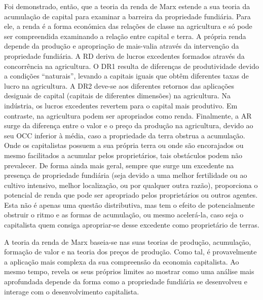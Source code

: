 Foi demonstrado, então, que a teoria da renda de Marx estende a sua teoria da acumulação de capital para examinar a barreira da propriedade fundiária. Para ele, a renda é a forma económica das relações de classe na agricultura e só pode ser compreendida examinando a relação entre capital e terra. A própria renda depende da produção e apropriação de mais-valia através da intervenção da propriedade fundiária. A RD deriva de lucros excedentes formados através da concorrência na agricultura. O DR1 resulta de diferenças de produtividade devido a condições “naturais”, levando a capitais iguais que obtêm diferentes taxas de lucro na agricultura. A DR2 deve-se aos diferentes retornos das aplicações desiguais de capital (capitais de diferentes dimensões) na agricultura. Na indústria, os lucros excedentes revertem para o capital mais produtivo. Em contraste, na agricultura podem ser apropriados como renda. Finalmente, a AR surge da diferença entre o valor e o preço da produção na agricultura, devido ao seu OCC inferior à média, caso a propriedade da terra obstrua a acumulação. Onde os capitalistas possuem a sua própria terra ou onde são encorajados ou mesmo facilitados a acumular pelos proprietários, tais obstáculos podem não prevalecer. De forma ainda mais geral, sempre que surge um excedente na presença de propriedade fundiária (seja devido a uma melhor fertilidade ou ao cultivo intensivo, melhor localização, ou por qualquer outra razão), proporciona o potencial de renda que pode ser apropriado pelos proprietários ou outros agentes. Esta não é apenas uma questão distributiva, mas tem o efeito de potencialmente obstruir o ritmo e as formas de acumulação, ou mesmo acelerá-la, caso seja o capitalista quem consiga apropriar-se desse excedente como proprietário de terras.
 \par 
A teoria da renda de Marx baseia-se nas suas teorias de produção, acumulação, formação de valor e na teoria dos preços de produção. Como tal, é provavelmente a aplicação mais complexa da sua compreensão da economia capitalista. Ao mesmo tempo, revela os seus próprios limites ao mostrar como uma análise mais aprofundada depende da forma como a propriedade fundiária se desenvolveu e interage com o desenvolvimento capitalista.
 \par 
